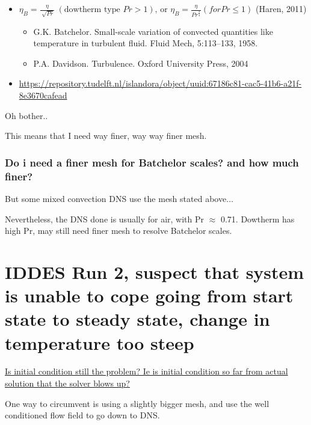 \documentclass[12pt]{article}
\renewcommand{\_}{\kern-1.5pt\textunderscore\kern-1.5pt}
\begin{document}
\begin{itemize}
	\item  \(  \eta _{B}=\frac{ \eta }{\sqrt[]{Pr}}~ \left( \text{dowtherm type }Pr>1 \right) \text{, or } \eta _{B}=\frac{ \eta }{Pr^{\frac{3}{4}}} \left( for Pr \leq 1 \right)  \)  (Haren, 2011)\par

\begin{itemize}
	\item G.K. Batchelor. Small-scale variation of convected quantities like temperature in turbulent fluid. Fluid Mech, 5:113–133, 1958.\par

	\item P.A. Davidson. Turbulence. Oxford University Press, 2004\par


\end{itemize}
	\item \href{https://repository.tudelft.nl/islandora/object/uuid:67186c81-cac5-41b6-a21f-8e3670cafead}{https://repository.tudelft.nl/islandora/object/uuid:67186c81-cac5-41b6-a21f-8e3670cafead} \par
\end{itemize}

 Oh bother..\par

This means that I need way finer, way way finer mesh.\par
\subsubsection{Do i need a finer mesh for Batchelor scales? and how much finer?}
But some mixed convection DNS use the mesh stated above$ \ldots $ \par

Nevertheless, the DNS done is usually for air, with Pr $\approx$ 0.71. Dowtherm has high Pr, may still need finer mesh to resolve Batchelor scales.

\section{IDDES Run 2, suspect that system is unable to cope going from start state to steady state, change in temperature too steep}
\uline{Is initial condition still the problem? Ie is initial condition so far from actual solution that the solver blows up?}\par

One way to circumvent is using a slightly bigger mesh, and use the well conditioned flow field to go down to DNS.\par
\end{document}
